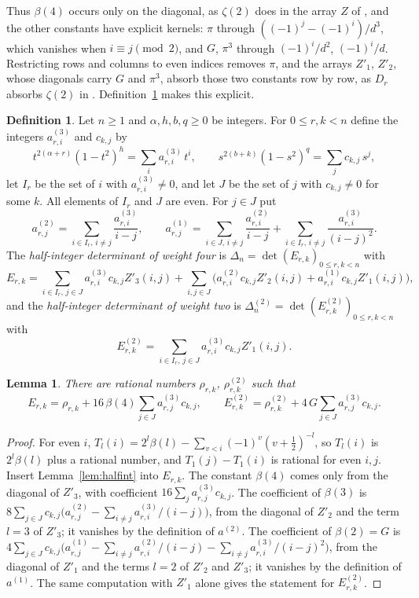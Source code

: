 \documentclass[11pt]{article}
\newtheorem{lemma}[theorem]{Lemma}
\theoremstyle{definition}
\newtheorem{definition}[theorem]{Definition}
\begin{document}
Thus $\beta(4)$ occurs only on the diagonal, as $\zeta(2)$ does in the array $Z$ of \cite[Eq.~(17)]{OAI}, and the other constants have explicit kernels: $\pi$ through $((-1)^j-(-1)^i)/d^3$, which vanishes when $i\equiv j\pmod2$, and $G$, $\pi^3$ through $(-1)^i/d^2$, $(-1)^i/d$. Restricting rows and columns to even indices removes $\pi$, and the arrays $Z'_1$, $Z'_2$, whose diagonals carry $G$ and $\pi^3$, absorb those two constants row by row, as $D_r$ absorbs $\zeta(2)$ in \cite{OAI}. Definition~\ref{def:halfint} makes this explicit.

\begin{definition}\label{def:halfint}
Let $n\ge1$ and $\alpha,h,b,q\ge0$ be integers. For $0\le r,k<n$ define the integers $a^{(3)}_{r,i}$ and $c_{k,j}$ by
\[
t^{2(\alpha+r)}(1-t^2)^h=\sum_i a^{(3)}_{r,i}\,t^i,\qquad s^{2(b+k)}(1-s^2)^q=\sum_j c_{k,j}\,s^j,
\]
let $I_r$ be the set of $i$ with $a^{(3)}_{r,i}\ne0$, and let $J$ be the set of $j$ with $c_{k,j}\ne0$ for some $k$. All elements of $I_r$ and $J$ are even. For $j\in J$ put
\[
a^{(2)}_{r,j}=\sum_{i\in I_r,\,i\ne j}\frac{a^{(3)}_{r,i}}{i-j},\qquad
a^{(1)}_{r,j}=\sum_{i\in J,\,i\ne j}\frac{a^{(2)}_{r,i}}{i-j}+\sum_{i\in I_r,\,i\ne j}\frac{a^{(3)}_{r,i}}{(i-j)^2}.
\]
The \emph{half-integer determinant of weight four} is $\Delta_n=\det(E_{r,k})_{0\le r,k<n}$ with
\[
E_{r,k}=\sum_{i\in I_r,\,j\in J}a^{(3)}_{r,i}c_{k,j}Z'_3(i,j)+\sum_{i,j\in J}\big(a^{(2)}_{r,i}c_{k,j}Z'_2(i,j)+a^{(1)}_{r,i}c_{k,j}Z'_1(i,j)\big),
\]
and the \emph{half-integer determinant of weight two} is $\Delta^{(2)}_n=\det(E^{(2)}_{r,k})_{0\le r,k<n}$ with
\[
E^{(2)}_{r,k}=\sum_{i\in I_r,\,j\in J}a^{(3)}_{r,i}c_{k,j}Z'_1(i,j).
\]
\end{definition}

\begin{lemma}\label{lem:entries}
There are rational numbers $\rho_{r,k}$, $\rho^{(2)}_{r,k}$ such that
\[
E_{r,k}=\rho_{r,k}+16\,\beta(4)\sum_{j\in J}a^{(3)}_{r,j}c_{k,j},\qquad E^{(2)}_{r,k}=\rho^{(2)}_{r,k}+4\,G\sum_{j\in J}a^{(3)}_{r,j}c_{k,j}.
\]
\end{lemma}

\begin{proof}
For even $i$, $T_l(i)=2^l\beta(l)-\sum_{v<i}(-1)^v(v+\frac12)^{-l}$, so $T_l(i)$ is $2^l\beta(l)$ plus a rational number, and $T_1(j)-T_1(i)$ is rational for even $i,j$. Insert Lemma~\ref{lem:halfint} into $E_{r,k}$. The constant $\beta(4)$ comes only from the diagonal of $Z'_3$, with coefficient $16\sum_ja^{(3)}_{r,j}c_{k,j}$. The coefficient of $\beta(3)$ is $8\sum_{j\in J}c_{k,j}\big(a^{(2)}_{r,j}-\sum_{i\ne j}a^{(3)}_{r,i}/(i-j)\big)$, from the diagonal of $Z'_2$ and the term $l=3$ of $Z'_3$; it vanishes by the definition of $a^{(2)}$. The coefficient of $\beta(2)=G$ is $4\sum_{j\in J}c_{k,j}\big(a^{(1)}_{r,j}-\sum_{i\ne j}a^{(2)}_{r,i}/(i-j)-\sum_{i\ne j}a^{(3)}_{r,i}/(i-j)^2\big)$, from the diagonal of $Z'_1$ and the terms $l=2$ of $Z'_2$ and $Z'_3$; it vanishes by the definition of $a^{(1)}$. The same computation with $Z'_1$ alone gives the statement for $E^{(2)}_{r,k}$.
\end{proof}
\end{document}
